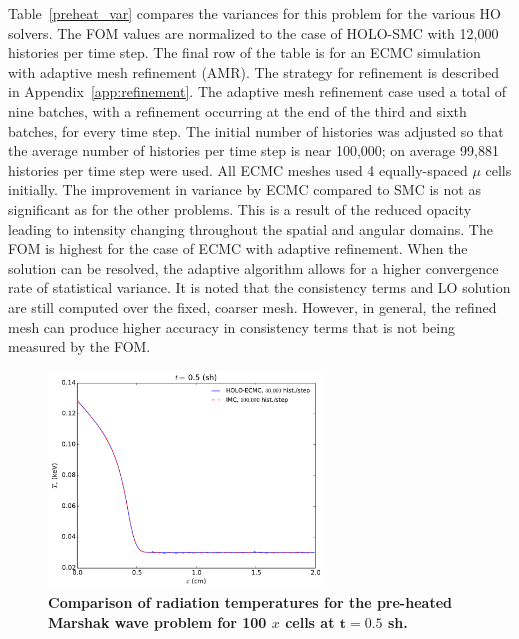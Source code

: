 \documentclass[12pt]{article}
\begin{document}
\begin{center}
Table~\ref{preheat_var} compares the variances for this problem for the various HO
solvers. The FOM values are normalized to the case of HOLO-SMC with 12,000
histories per time step. The final row of the table is for an ECMC simulation with adaptive mesh
refinement (AMR).  The strategy for refinement is described in
Appendix~\ref{app:refinement}.  The adaptive
mesh refinement case used a total of nine batches, with a refinement occurring at the end
of the third and sixth batches, for every time step. The initial number of histories was adjusted so that
the average number of histories per time step is near 100,000; on average 99,881
histories per time step were used.  All ECMC meshes used 4 equally-spaced $\mu$ cells
initially. 
   The improvement in variance by ECMC compared to SMC is not as significant
as for the other problems.  This is a
result of the reduced opacity leading to intensity changing throughout the spatial
and angular domains.  The
FOM is highest for the case of ECMC with adaptive refinement. When the solution can
be resolved, the adaptive algorithm allows for a higher convergence rate of
statistical variance.  It is noted that the consistency terms and LO solution are still computed over
the fixed, coarser mesh.  However, in general, the refined mesh can produce higher accuracy in consistency terms that is
not being measured by the FOM.
\begin{figure}[htb]
  \centering
    \includegraphics[width=0.65\textwidth]{heated_marshak.pdf}
    \caption{\label{hot_plot}\bf Comparison of radiation temperatures for the pre-heated Marshak wave problem for 100
    $x$ cells at $\mathbf{t=0.5}$ sh.}
\end{figure}



\end{center}
\end{document}
